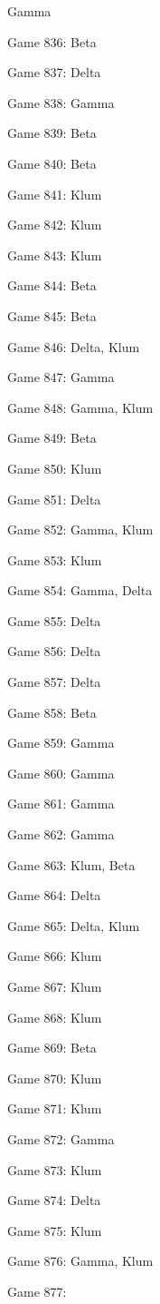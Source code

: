 \documentclass{article}
\begin{document}
\begin{multicols}{3}
\begin{compactitem}
Gamma
\item Game 836:
Beta
\item Game 837:
Delta
\item Game 838:
Gamma
\item Game 839:
Beta
\item Game 840:
Beta
\item Game 841:
Klum
\item Game 842:
Klum
\item Game 843:
Klum
\item Game 844:
Beta
\item Game 845:
Beta
\item Game 846:
Delta, Klum
\item Game 847:
Gamma
\item Game 848:
Gamma, Klum
\item Game 849:
Beta
\item Game 850:
Klum
\item Game 851:
Delta
\item Game 852:
Gamma, Klum
\item Game 853:
Klum
\item Game 854:
Gamma, Delta
\item Game 855:
Delta
\item Game 856:
Delta
\item Game 857:
Delta
\item Game 858:
Beta
\item Game 859:
Gamma
\item Game 860:
Gamma
\item Game 861:
Gamma
\item Game 862:
Gamma
\item Game 863:
Klum, Beta
\item Game 864:
Delta
\item Game 865:
Delta, Klum
\item Game 866:
Klum
\item Game 867:
Klum
\item Game 868:
Klum
\item Game 869:
Beta
\item Game 870:
Klum
\item Game 871:
Klum
\item Game 872:
Gamma
\item Game 873:
Klum
\item Game 874:
Delta
\item Game 875:
Klum
\item Game 876:
Gamma, Klum
\item Game 877:

\end{compactitem}
\end{multicols}
\end{document}
